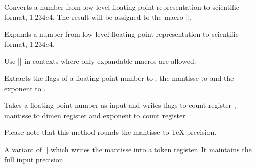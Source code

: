 \begin{command}{\pgfmathfloattosci{}}
	Converts a number from low-level floating point representation to scientific format, $1.234e4$. The result will be assigned to the macro |\pgfmathresult|.
\end{command}
\begin{command}{\pgfmathfloatvalueof{}}
	Expands a number from low-level floating point representation to scientific format, $1.234e4$.

	Use |\pgfmathfloatvalueof| in contexts where only expandable macros are allowed.
\end{command}


\begin{command}{}
	Extracts the flags of a floating point number  to , the mantisse to  and the exponent to .
\end{command}

\begin{command}{}
	Takes a floating point number  as input and writes flags to count
	register , mantisse to dimen register  and exponent to count
	register .

	Please note that this method rounds the mantisse to \TeX-precision.
\end{command}

\begin{command}{}
	A variant of |\pgfmathfloattoregisters| which writes the mantisse into a token register. It maintains the full input precision.
\end{command}

